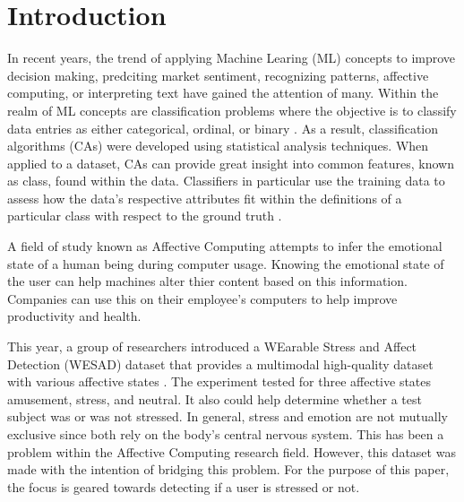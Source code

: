 \section{Introduction}
\label{sec:intro}

In recent years, the trend of applying Machine Learing (ML) concepts to improve decision making, predciting 
market sentiment, recognizing patterns, affective computing, or interpreting text have gained the attention of many. 
Within the realm of ML concepts are classification problems where the objective is to classify data entries 
as either categorical, ordinal, or binary \cite[p. 327-328]{textbook}. 
As a result, classification algorithms (CAs) were developed using statistical analysis techniques. 
When applied to a dataset, CAs can provide great insight into common features, known as class,
found within the data. Classifiers in particular use the training data to assess how the data's respective 
attributes fit within the definitions of a particular class with respect to the ground truth \cite{class}. 

A field of study known as Affective Computing attempts to infer the emotional state of a human being during computer usage. 
 Knowing the emotional state of the user can help machines alter thier 
content based on this information. Companies can use this on their employee's computers to help improve 
productivity and health. 

This year, a group of researchers introduced a WEarable Stress and Affect Detection (WESAD) dataset that 
provides a multimodal high-quality dataset with various affective states \cite{WESAD}. The experiment 
tested for three affective states amusement, stress, and neutral. It also could help determine whether a test 
subject was or was not stressed. In general, stress and emotion are not mutually exclusive since both 
rely on the body's central nervous system. This has been a problem within the Affective Computing 
research field. However, this dataset was made with the intention of bridging this problem. 
For the purpose of this paper, the focus is geared towards detecting if a user is stressed or not.  
